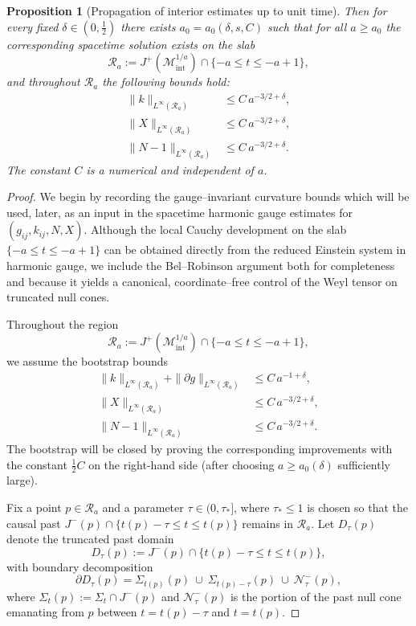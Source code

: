 \documentclass{amsart}
\newtheorem{proposition}{Proposition}[section]
\begin{document}
{\begin{proposition}[Propagation of interior estimates up to unit time]
\medskip

\noindent Then for every fixed $\delta\in(0,\tfrac12)$ there exists $a_{0}=a_{0}(\delta,s,C)$ such that for all
$a\ge a_{0}$ the corresponding spacetime solution exists on the slab
\[
\mathcal{R}_{a}:=
J^{+}(\mathcal{M}^{1/a}_{\mathrm{int}})
\cap \{-a \le t \le -a+1\},
\]
and throughout $\mathcal{R}_{a}$ the following bounds hold:
\begin{align}
\|k\|_{L^\infty(\mathcal{R}_{a})}
&\le C\, a^{-3/2+\delta}, \\\nonumber
\|X\|_{L^\infty(\mathcal{R}_{a})}
&\le C\, a^{-3/2+\delta}, \\\nonumber
\|N-1\|_{L^\infty(\mathcal{R}_{a})}
&\le C\, a^{-3/2+\delta}.
\end{align}
The constant $C$ is a numerical and
independent of $a$.
\end{proposition}

\begin{proof}
\noindent
We begin by recording the gauge--invariant curvature bounds which will be used, later, as an input in the
spacetime harmonic gauge estimates for $(g_{ij},k_{ij},N,X)$.  Although the local Cauchy development on the slab
$\{-a\le t\le -a+1\}$ can be obtained directly from the reduced Einstein system in harmonic gauge, we include the
Bel--Robinson argument both for completeness and because it yields a canonical, coordinate--free control of the
Weyl tensor on truncated null cones.

\medskip

\noindent
Throughout the region
\[
\mathcal{R}_{a}:=
J^{+}(\mathcal{M}^{1/a}_{\mathrm{int}})
\cap \{-a \le t \le -a+1\},
\]
we assume the bootstrap bounds
\begin{align}
\label{eq:boot1}
\|k\|_{L^\infty(\mathcal{R}_{a})}+\|\partial g\|_{L^\infty(\mathcal{R}_{a})}
&\le C\, a^{-1+\delta}, \\
\label{eq:boot2}
\|X\|_{L^\infty(\mathcal{R}_{a})}
&\le C\, a^{-3/2+\delta}, \\
\label{eq:boot3}
\|N-1\|_{L^\infty(\mathcal{R}_{a})}
&\le C\, a^{-3/2+\delta}.
\end{align}
The bootstrap will be closed by proving the corresponding improvements with the constant $\tfrac12 C$ on the
right-hand side (after choosing $a\ge a_{0}(\delta)$ sufficiently large).

\medskip

\noindent
Fix a point $p\in \mathcal{R}_{a}$ and a parameter $\tau\in(0,\tau_{*}]$, where $\tau_{*}\le 1$ is chosen so that
the causal past $J^{-}(p)\cap\{t(p)-\tau\le t\le t(p)\}$ remains in $\mathcal{R}_{a}$.  Let $D_{\tau}(p)$
denote the truncated past domain
\[
D_{\tau}(p):=J^{-}(p)\cap\{t(p)-\tau\le t\le t(p)\},
\]
with boundary decomposition
\[
\partial D_{\tau}(p)
=\Sigma_{t(p)}(p)\ \cup\ \Sigma_{t(p)-\tau}(p)\ \cup\ \mathcal{N}^{-}_{\tau}(p),
\]
where $\Sigma_{t}(p):=\Sigma_{t}\cap J^{-}(p)$ and $\mathcal{N}^{-}_{\tau}(p)$ is the portion of the past null cone
emanating from $p$ between $t=t(p)-\tau$ and $t=t(p)$.


\end{proof}}
\end{document}
